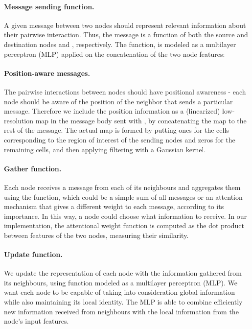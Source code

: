 \documentclass{article}
\begin{document}
\paragraph{Message sending function.} A given message between two nodes should represent relevant information about their pairwise interaction. Thus, the message is a function of both the source and destination nodes  and , respectively. The function,  is modeled as a multilayer perceptron (MLP) applied on the concatenation of the two node features: 



\paragraph{Position-aware messages.}
The pairwise interactions between nodes should have positional awareness - each node should be aware of the position of the neighbor that sends a particular message. Therefore we include the position information as a (linearized) low-resolution  map in the message body sent with , by concatenating the map to the rest of the message. The actual map is formed by putting ones for the cells corresponding to the region of interest of the sending nodes and zeros for the remaining cells, and then applying filtering with a Gaussian kernel.


\paragraph{Gather function.}
Each node receives a message from each of its neighbours and aggregates them using the  function, which could be a simple sum of all messages or an attention mechanism that gives a different weight to each message, according to its importance. In this way, a node could choose what information to receive. In our implementation, the attentional weight function  is computed as the dot product between features of the two nodes, measuring their similarity.




\paragraph{Update function.} We update the representation of each node with the information gathered from its neighbours, using function  modeled as a 
multilayer perceptron (MLP). We want each node to be capable of taking into consideration global information while also maintaining its local identity. The MLP is able to combine efficiently new information received from neighbours with the local information from the node's input features.
\end{document}
